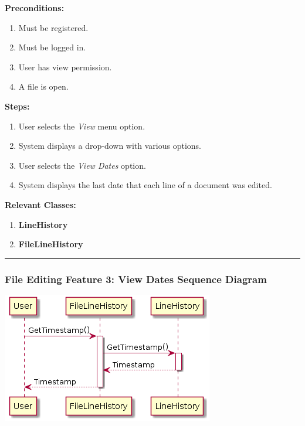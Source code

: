 \documentclass[twoside,letterpaper]{article}
\begin{document}
	\noindent\textbf{Preconditions:}
	\begin{enumerate}
		\item Must be registered.
		\item Must be logged in.
		\item User has view permission.
		\item A file is open.
	\end{enumerate}
	\noindent\textbf{Steps:}
	\begin{enumerate}
		\item User selects the \textit{View} menu option.
		\item System displays a drop-down with various options.
		\item User selects the \textit{View Dates} option.
		\item System displays the last date that each line of a document was edited.
	\end{enumerate}
	\noindent\textbf{Relevant Classes:}
	\begin{enumerate}
		\item \textbf {LineHistory}
		\item \textbf {FileLineHistory}
	\end{enumerate}
\vspace{8pt}
\hrule
\newpage

\subsubsection[File Editing Feature 3: View Dates Sequence Diagram]{\rmfamily\bfseries\color{black}
	File Editing Feature 3: View Dates Sequence Diagram}
\hypertarget{RefHeading22059017292}{}

\bigskip

\includegraphics[width=\textwidth]{images/SequenceDiagrams/EditDate}
\end{document}
